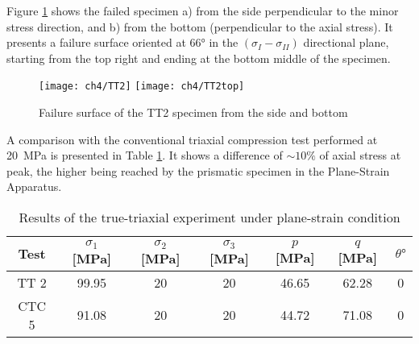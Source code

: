 Figure \ref{fig4:14} shows the failed specimen a) from the side perpendicular to the minor stress direction, and b) from the bottom (perpendicular to the axial stress). It presents a failure surface oriented at \ang{66} in the $(\sigma_I-\sigma_{II})$ directional plane, starting from the top right and ending at the bottom middle of the specimen. 


\begin{figure}[tb]
    \centering
    \texttt{[image: ch4/TT2]}
    \texttt{[image: ch4/TT2top]}
    \caption{Failure surface of the TT2 specimen from the side and bottom}
    \label{fig4:14}
\end{figure} 





A comparison with the conventional triaxial compression test performed at \SI{20}{MPa} is presented in Table \ref{tb4:TT2_CTC5}. It shows a difference of $\sim 10\%$ of axial stress at peak, the higher being reached by the prismatic specimen in the Plane-Strain Apparatus.

\begin{table}
    \centering
    \begin{tabular}{ccccccc}
        \hline
        Test & $\sigma_1$ [\si{MPa}] & $\sigma_2$ [\si{MPa}] & $\sigma_3$ [\si{MPa}] & $p$ [\si{MPa}] & $q$ [\si{MPa}] & $\theta \si{\degree}$ \\
        \hline
        \hline
        TT 2 & 99.95 & 20 & 20 & 46.65 & 62.28 & 0\\
        CTC 5 & 91.08 & 20 & 20 & 44.72 & 71.08 & 0 \\
        \hline
    \end{tabular}
    \caption{Results of the true-triaxial experiment under plane-strain condition}
    \label{tb4:TT2_CTC5}
\end{table}

